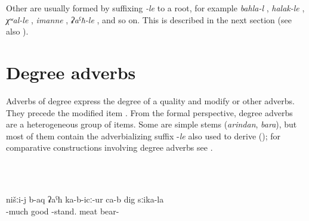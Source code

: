 Other  are usually formed by suffixing \textit{-le} to a root, for example \textit{bahla-l} , \textit{halak-le} , \textit{χʷal-le} , \textit{imanne} , \textit{ʡaˁħ-le} , and so on. This is described in the next section (see also ).



\section{Degree adverbs}
\label{sec:Degree adverbs}

Adverbs of degree express the degree of a quality and modify  or other adverbs. They precede the modified item . From the formal perspective, degree adverbs are a heterogeneous group of items. Some are simple stems (\textit{arindan}, \textit{bara}), but most of them contain the adverbializing suffix -\textit{le} also used to derive   (); for comparative constructions involving degree adverbs see . 

\begin{exe}
	\ex	\label{ex:listDegreeAdverbs}
	\begin{xlist}
		\TabPositions{14em}
		  \tab {}  \\
		  \tab {}  \\
          \tab {} 
		\end{xlist}
\end{exe}


\begin{exe}
		\ex	\label{ex:‎‎We liked the meat of the bear very much}
	\gll	nišːi-j	b-aq	ʡaˁħ	ka-b-icː-ur ca-b	dig	sːika-la	\\
		 	-much	good	-stand. 	meat	bear- \\
	\glt	{}
	\end{exe}
	
